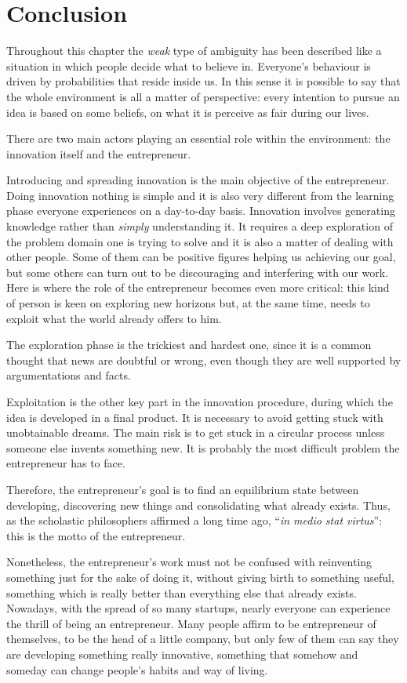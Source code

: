 \section{Conclusion}
Throughout this chapter the \textit{weak} type of ambiguity has been described like a situation in which people decide what to believe in. Everyone’s behaviour is driven by probabilities that reside inside us. In this sense it is possible to say that the whole environment is all a matter of perspective: every intention to pursue an idea is based on some beliefs, on what it is perceive as fair during our lives.

There are two main actors playing an essential role within the environment: the innovation itself and the entrepreneur.

Introducing and spreading innovation is the main objective of the entrepreneur. Doing innovation nothing is simple and it is also very different from the learning phase everyone experiences on a day-to-day basis. Innovation involves generating knowledge rather than \textit{simply} understanding it. It requires a deep exploration of the problem domain one is trying to solve and it is also a matter of dealing with other people. Some of them can be positive figures helping us achieving our goal, but some others can turn out to be discouraging and interfering with our work.
Here is where the role of the entrepreneur becomes even more critical: this kind of person is keen on exploring new horizons but, at the same time, needs to exploit what the world already offers to him.

The exploration phase is the trickiest and hardest one, since it is a common thought that news are doubtful or wrong, even though they are well supported by argumentations and facts.

Exploitation is the other key part in the innovation procedure, during which the idea is developed in a final product. It is necessary to avoid getting stuck with unobtainable dreams. The main risk is to get stuck in a circular process unless someone else invents something new. It is probably the most difficult problem the entrepreneur has to face.

Therefore, the entrepreneur’s goal is to find an equilibrium state between developing, discovering new things and consolidating what already exists. Thus, as the scholastic philosophers affirmed a long time ago, ``\textit{in medio stat virtus}'': this is the motto of the entrepreneur.

Nonetheless, the entrepreneur’s work must not be confused with reinventing something just for the sake of doing it, without giving birth to something useful, something which is really better than everything else that already exists. Nowadays, with the spread of so many startups, nearly everyone can experience the thrill of being an entrepreneur. Many people affirm to be entrepreneur of themselves, to be the head of a little company, but only few of them can say  they are developing something really innovative, something that somehow and someday can change people's habits and way of living.

